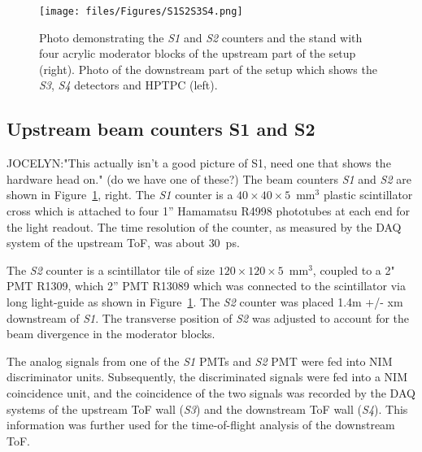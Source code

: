 \begin{figure}[t]
  \centering
  \texttt{[image: files/Figures/S1S2S3S4.png]}
  \caption{Photo demonstrating the \textit{S1} and \textit{S2} counters and the stand with four acrylic moderator blocks of the upstream part of the setup (right). Photo of the downstream part of the setup which shows the \textit{S3}, \textit{S4} detectors and HPTPC (left).}
  \label{fig:modblocks}
\end{figure}

\subsection{Upstream beam counters S1 and S2}
\label{subsec:s1s2Exp}
JOCELYN:"This actually isn't a good picture of S1, need one that shows the hardware head on." (do we have one of these?)
The beam counters \textit{S1} and \textit{S2} are shown in Figure~\ref{fig:modblocks}, right.
The \textit{S1} counter is a $40\times40\times5$~mm$^3$ plastic scintillator cross which is attached to four 1'' Hamamatsu R4998 phototubes at each end for the light readout.
The time resolution of the counter, as measured by the DAQ system of the upstream ToF, was about 30~ps. 

The \textit{S2} counter is a scintillator tile of size $120\times120\times5$~mm$^3$, coupled to a 2" PMT R1309, which  2'' PMT R13089 which was connected to the scintillator via long light-guide as shown in Figure~\ref{fig:modblocks}.
The \textit{S2} counter was placed 1.4m +/- xm  downstream of \textit{S1}.
The transverse position of \textit{S2} was adjusted to account for the beam divergence in the moderator blocks.

The analog signals from one of the \textit{S1} PMTs and \textit{S2} PMT were fed into NIM discriminator units.
Subsequently, the discriminated signals were fed into a NIM coincidence unit, and the coincidence of the two signals was recorded by the DAQ systems of the upstream ToF wall (\textit{S3}) and the downstream ToF wall (\textit{S4}). This information was further used for the time-of-flight analysis of the downstream ToF. 


